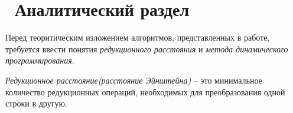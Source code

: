 \chapter{ Аналитический раздел}
\label{cha:analysis}

Перед теоритическим изложением алгоритмов, представленных в работе, требуется ввести понятия \textit{редукционного расстояния} и \textit{метода динамического программирования}. 


\textit{Редукционное расстояние(расстояние Эйнштейна)} -- это минимальное количество  редукционных операций, необходимых для преобразования одной строки в другую. 
